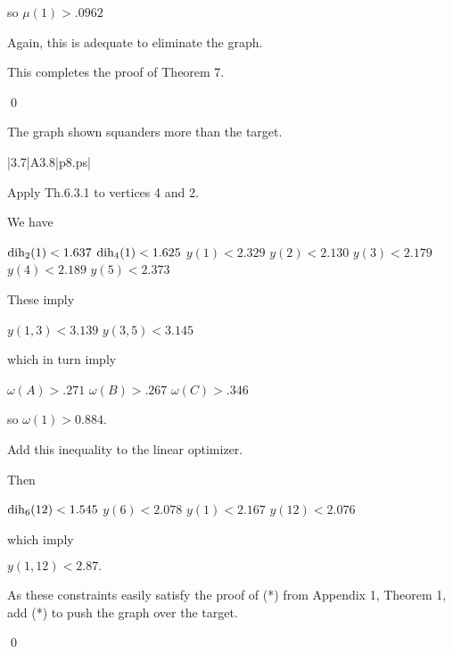 so $\mu(1)>.0962$

Again, this is adequate to eliminate the graph.


This completes the proof of Theorem 7.

\qed


\bigskip



 The graph shown 
squanders more than the target.  \endproclaim

\gram|3.7|A3.8|p8.ps|  %

Apply Th.6.3.1 to vertices 4 and 2.


We have 

$\operatorname{dih}_2(1) < 1.637$ \newline
$\operatorname{dih}_4(1) < 1.625$ \newline
$y(1)<2.329$ \newline
$y(2)<2.130$ \newline
$y(3)<2.179$ \newline
$y(4)<2.189$ \newline
$y(5)<2.373$ \newline

These imply 

$y(1,3)<3.139$ \newline
$y(3,5)<3.145$ \newline

which in turn imply

$\omega(A)>.271$ \newline
$\omega(B)>.267$ \newline
$\omega(C)>.346$ \newline

so $\omega(1)>0.884$.

Add this inequality to the linear optimizer.

Then

$\operatorname{dih}_6(12)<1.545$ \newline
$y(6)<2.078$ \newline
$y(1)<2.167$ \newline
$y(12)<2.076$ \newline

which imply

$y(1,12)<2.87.$ \newline

As these constraints easily satisfy the proof of (*) from
Appendix 1, Theorem 1, add (*) to push the graph over the target.

\qed

